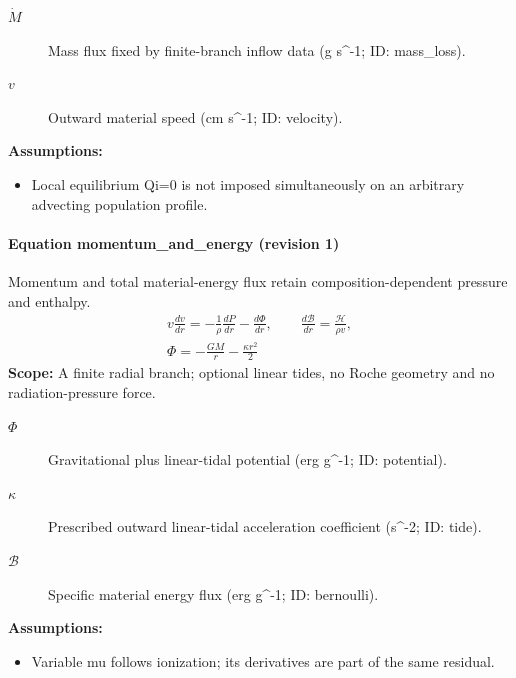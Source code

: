 \begin{description}
\item[$\dot M$] Mass flux fixed by finite-branch inflow data (g s\textasciicircum{}-1; ID: mass\_loss).
\item[$v$] Outward material speed (cm s\textasciicircum{}-1; ID: velocity).
\end{description}

\noindent\textbf{Assumptions:}
\begin{itemize}
\item Local equilibrium Qi=0 is not imposed simultaneously on an arbitrary advecting population profile.
\end{itemize}

\paragraph{Equation momentum\_and\_energy (revision 1)}
Momentum and total material-energy flux retain composition-dependent pressure and enthalpy.
\begin{equation}
\begin{aligned}
v\frac{dv}{dr}=-\frac1\rho\frac{dP}{dr}-\frac{d\Phi}{dr},\qquad\frac{d\mathcal B}{dr}=\frac{\mathcal H}{\rho v},\\\Phi=-\frac{GM}{r}-\frac{\kappa r^2}{2}
\end{aligned}
\label{eq:escape.coupled_5f_hydrogen:momentum_5f_and_5f_energy:1}
\end{equation}
\noindent\textbf{Scope:} A finite radial branch; optional linear tides, no Roche geometry and no radiation-pressure force.

\begin{description}
\item[$\Phi$] Gravitational plus linear-tidal potential (erg g\textasciicircum{}-1; ID: potential).
\item[$\kappa$] Prescribed outward linear-tidal acceleration coefficient (s\textasciicircum{}-2; ID: tide).
\item[$\mathcal B$] Specific material energy flux (erg g\textasciicircum{}-1; ID: bernoulli).
\end{description}

\noindent\textbf{Assumptions:}
\begin{itemize}
\item Variable mu follows ionization; its derivatives are part of the same residual.
\end{itemize}

